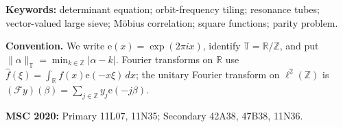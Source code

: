 \documentclass[11pt]{article}
\theoremstyle{definition}
\theoremstyle{remark}
\newcommand{\R}{\mathbb R}
\newcommand{\T}{\mathbb T}
\newcommand{\Z}{\mathbb Z}
\newcommand{\e}{\mathrm e}
\begin{document}
\noindent\textbf{Keywords:} determinant equation; orbit-frequency
tiling; resonance tubes; vector-valued large sieve; {M}{\"o}bius
correlation; square functions; parity problem.

\medskip
\noindent\textbf{Convention.}
We write \(\e(x)=\exp(2\pi i x)\), identify \(\T=\R/\Z\), and put
\(\|\alpha\|_{\T}=\min_{k\in\Z}|\alpha-k|\).  Fourier transforms on
\(\R\) use
\(\widehat f(\xi)=\int_{\R}f(x)\e(-x\xi)\,dx\); the unitary Fourier
transform on \(\ell^2(\Z)\) is
\((\mathscr Fy)(\beta)=\sum_{j\in\Z}y_j\e(-j\beta)\).

\medskip
\noindent\textbf{MSC 2020:} Primary 11L07, 11N35; Secondary 42A38,
47B38, 11N36.













\begingroup
\small
\raggedright
\setlength{\bibsep}{4pt plus 1pt minus 1pt}


\endgroup
\end{document}
